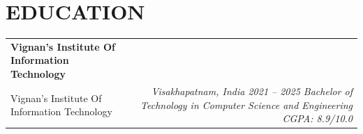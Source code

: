 \documentclass[a4paper,10pt]{article}
\makeatletter
\newcommand{\resumeSubheading}[4]{
  \vspace{2.5pt}\nopagebreak[3]
  \begin{tabular*}{1.0\textwidth}[t]{l@{\extracolsep{\fill}}r}
    \textbf{#1} & \textit{\small #2} \\[-1.5pt]
    {\small #3} & \textit{\small #4}
  \end{tabular*}\nopagebreak[4]
}
\makeatother
\begin{document}
\section{EDUCATION}
\resumeSubheading
  {Vignan's Institute Of Information Technology}{}
  {Vignan's Institute Of Information Technology}{Visakhapatnam, India 2021 -- 2025 Bachelor of Technology in Computer Science and Engineering CGPA: 8.9/10.0}
\end{document}
